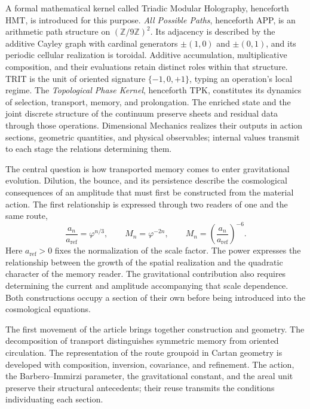 A formal mathematical kernel called Triadic Modular Holography,
henceforth HMT, is introduced for this purpose. \emph{All Possible
Paths}, henceforth APP, is an arithmetic path structure on
\((\mathbb Z/9\mathbb Z)^2\). Its adjacency is described by the additive
Cayley graph with cardinal generators \(\pm(1,0)\) and \(\pm(0,1)\),
and its periodic cellular realization is toroidal. Additive
accumulation, multiplicative composition, and their evaluations retain
distinct roles within that structure. TRIT is the unit of oriented
signature \(\{-1,0,+1\}\), typing an operation's local regime. The
\emph{Topological Phase Kernel}, henceforth TPK, constitutes its dynamics
of selection, transport, memory, and prolongation. The enriched state and
the joint discrete structure of the continuum preserve sheets and
residual data through those operations. Dimensional Mechanics realizes
their outputs in action sections, geometric quantities, and physical
observables; internal values transmit to each stage the relations
determining them.

The central question is how transported memory comes to enter
gravitational evolution. Dilution, the bounce, and its persistence
describe the cosmological consequences of an amplitude that must first
be constructed from the material action. The first relationship is expressed
through two readers of one and the same route,
\begin{equation}
 \frac{a_n}{a_{\mathrm{ref}}}=\varphi^{n/3},
 \qquad M_n=\varphi^{-2n},
 \qquad
 M_n=\left(\frac{a_n}{a_{\mathrm{ref}}}\right)^{-6}.
 \label{vii:eq:programa-dilucion}
\end{equation}
Here \(a_{\mathrm{ref}}>0\) fixes the normalization of the scale factor.
The power expresses the relationship between the growth of the spatial
realization and the quadratic character of the memory reader. The gravitational
contribution also requires determining the current and amplitude accompanying
that scale dependence. Both constructions occupy a section of their own
before being introduced into the cosmological equations.

The first movement of the article brings together construction and geometry.
The decomposition of transport distinguishes symmetric memory from oriented
circulation. The representation of the route groupoid in Cartan geometry
is developed with composition, inversion, covariance, and refinement.
The action, the Barbero--Immirzi parameter, the gravitational constant, and the
areal unit preserve their structural antecedents; their reuse
transmits the conditions individuating each section.


